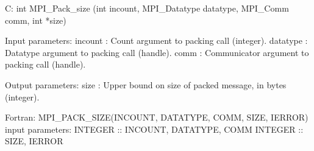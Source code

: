 C:
int MPI_Pack_size
   (int incount, MPI_Datatype datatype, MPI_Comm comm, int *size)

Input parameters:
incount : Count argument to packing call (integer).
datatype : Datatype argument to packing call (handle).
comm : Communicator argument to packing call (handle).

Output parameters:
size : Upper bound on size of packed message, in bytes (integer).

Fortran:
MPI_PACK_SIZE(INCOUNT, DATATYPE, COMM, SIZE, IERROR)
input parameters:
INTEGER :: INCOUNT, DATATYPE, COMM
INTEGER :: SIZE, IERROR

